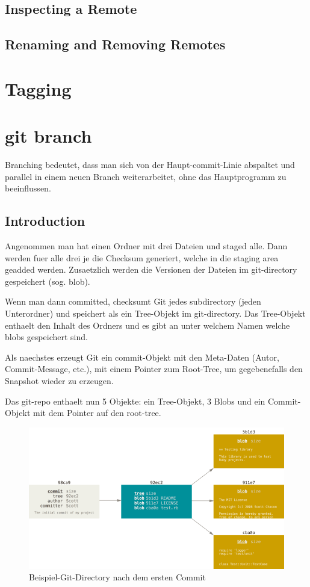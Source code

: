 \documentclass{article}
\begin{document}
\subsection*{Inspecting a Remote}
\subsection*{Renaming and Removing Remotes}

\section*{Tagging}



\section*{git branch}
Branching bedeutet, dass man sich von der Haupt-commit-Linie abspaltet und parallel in einem neuen Branch weiterarbeitet, ohne das Hauptprogramm zu beeinflussen.

\subsection*{Introduction}
Angenommen man hat einen Ordner mit drei Dateien und staged alle. Dann werden fuer alle drei je die Checksum generiert, welche in die staging area geadded werden. Zusaetzlich werden die Versionen der Dateien im git-directory gespeichert (sog. blob).

Wenn man dann committed, checksumt Git jedes subdirectory (jeden Unterordner) und speichert als ein Tree-Objekt im git-directory. Das Tree-Objekt enthaelt den Inhalt des Ordners und es gibt an unter welchem Namen welche blobs gespeichert sind.

Als naechstes erzeugt Git ein commit-Objekt mit den Meta-Daten (Autor, Commit-Message, etc.), mit einem Pointer zum Root-Tree, um gegebenefalls den Snapshot wieder zu erzeugen.

Das git-repo enthaelt nun 5 Objekte: ein Tree-Objekt, 3 Blobs und ein Commit-Objekt mit dem Pointer auf den root-tree.

\begin{figure}[h!]
    \centering
    \includegraphics[width=\textwidth]{../bilder/branch1.png}
    \caption{Beispiel-Git-Directory nach dem ersten Commit}
    \label{branch1}
\end{figure} 
\end{document}
